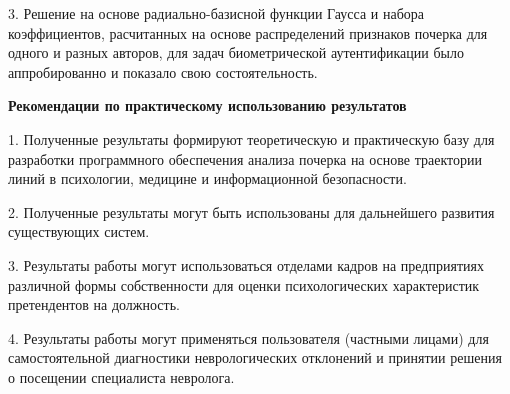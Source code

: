3. Решение на основе радиально-базисной функции Гаусса и набора коэффициентов, расчитанных на основе распределений признаков почерка для одного и разных авторов, для задач биометрической аутентификации было аппробированно и показало свою состоятельность.

\textbf{Рекомендации по практическому использованию результатов}
\bigskip

1. Полученные результаты формируют теоретическую и практическую базу для разработки программного обеспечения анализа почерка на основе траектории линий в психологии, медицине и информационной безопасности.

2. Полученные результаты могут быть использованы для дальнейшего развития существующих систем.

3. Результаты работы могут использоваться отделами кадров на предприятиях различной формы собственности для оценки психологических характеристик претендентов на должность.

4. Результаты работы могут применяться пользователя (частными лицами) для самостоятельной диагностики неврологических отклонений и принятии решения о посещении специалиста невролога.